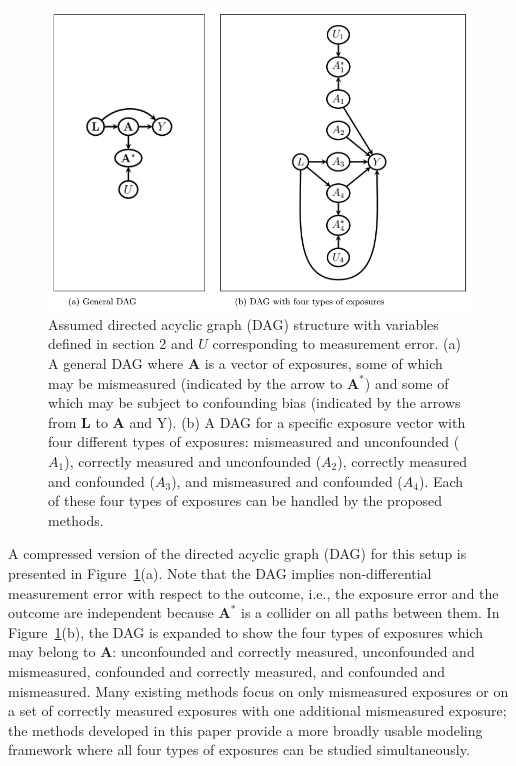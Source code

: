 \documentclass[useAMS,usenatbib,referee]{biom}
\begin{document}
\begin{figure}
\centering
\includegraphics[width=6in]{Paper1_Fig1.png}
\caption{Assumed directed acyclic graph (DAG) structure with variables defined in section 2 and $U$ corresponding to measurement error. (a) A general DAG where $\bm{A}$ is a vector of exposures, some of which may be mismeasured (indicated by the arrow to $\bm{A}^{*}$) and some of which may be subject to confounding bias (indicated by the arrows from $\bm{L}$ to $\bm{A}$ and Y). (b) A DAG for a specific exposure vector with four different types of exposures: mismeasured and unconfounded ($A_{1}$), correctly measured and unconfounded ($A_{2}$), correctly measured and confounded ($A_{3}$), and mismeasured and confounded ($A_{4}$). Each of these four types of exposures can be handled by the proposed methods.}
\label{fig:one}
\end{figure}

A compressed version of the directed acyclic graph (DAG) for this setup is presented in Figure~\ref{fig:one}(a). Note that the DAG implies non-differential measurement error with respect to the outcome, i.e., the exposure error and the outcome are independent because $\bm{A}^{*}$ is a collider on all paths between them. In Figure~\ref{fig:one}(b), the DAG is expanded to show the four types of exposures which may belong to $\bm{A}$: unconfounded and correctly measured, unconfounded and mismeasured, confounded and correctly measured, and confounded and mismeasured. Many existing methods focus on only mismeasured exposures or on a set of correctly measured exposures with one additional mismeasured exposure; the methods developed in this paper provide a more broadly usable modeling framework where all four types of exposures can be studied simultaneously.
\end{document}
